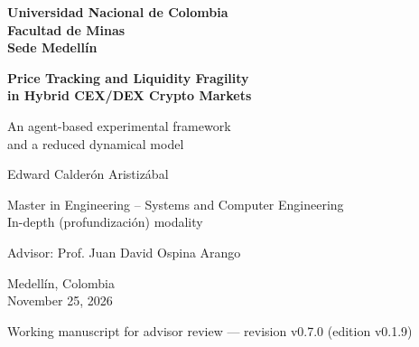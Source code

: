 \documentclass[11pt,letterpaper]{report}
\newcommand{\versionTesis}{v0.1.9}
\newcommand{\revisionManuscrito}{v0.7.0}
\numberwithin{equation}{chapter}
\begin{document}
\begin{titlepage}
  \thispagestyle{empty}
  \centering
  \singlespacing
  {\large\bfseries Universidad Nacional de Colombia\\[2pt]
  Facultad de Minas\\[2pt]
  Sede Medellín\par}
  \vspace{3.2cm}
  {\LARGE\bfseries Price Tracking and Liquidity Fragility\\
  in Hybrid CEX/DEX Crypto Markets\par}
  \vspace{0.9cm}
  {\Large An agent-based experimental framework\\
  and a reduced dynamical model\par}
  \vspace{2.6cm}
  {\Large Edward Calderón Aristizábal\par}
  \vspace{1.6cm}
  {\large Master in Engineering -- Systems and Computer Engineering\\[2pt]
  In-depth (profundización) modality\par}
  \vspace{0.8cm}
  {\large Advisor: Prof. Juan David Ospina Arango\par}
  \vfill
  {\large Medellín, Colombia\\[2pt]
  November 25, 2026\par}
  \vspace{0.3cm}
  {\small Working manuscript for advisor review --- revision \revisionManuscrito{} (edition \versionTesis{})\par}
\end{titlepage}

\setcounter{page}{1}

\begingroup
\setcounter{secnumdepth}{-1}
\titleformat{\section}{\Large\bfseries}{}{0pt}{}
\singlespacing

\clearpage

\endgroup
\setcounter{secnumdepth}{2}
\end{document}

